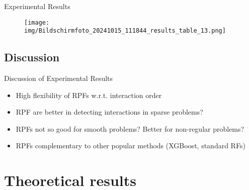 \documentclass{beamer}
\begin{document}
\begin{frame}{Experimental Results}

    \begin{figure}[h]
        \centering
        \vspace{-10pt} %
        \texttt{[image: img/Bildschirmfoto\_20241015\_111844\_results\_table\_13.png]}
        \vspace{-10pt}
        \label{fig:Figure_Ewald-MP_Algo_Structure}
    \end{figure}
    
\end{frame}



\subsection{Discussion}

\begin{frame}{Discussion of Experimental Results}
    
    \begin{itemize}
        \item High flexibility of RPFs w.r.t. interaction order
        \item RPF are better in detecting interactions in sparse problems?
        \item RPFs not so good for smooth problems? Better for non-regular problems?
        \item RPFs complementary to other popular methods (XGBoost, standard RFs)
    \end{itemize}
    
\vspace{1cm}

\end{frame}



\section{Theoretical results}
\end{document}
